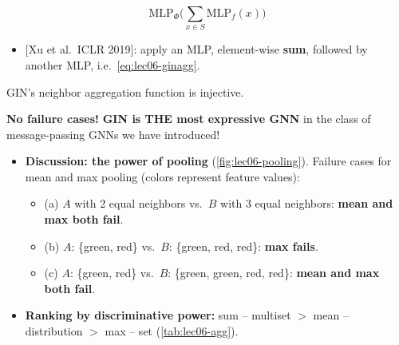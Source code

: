 \begin{equation}\label{eq:lec06-ginagg}
  \mathrm{MLP}_{\Phi}\Big(\sum_{x\in S}\mathrm{MLP}_f(x)\Big)
\end{equation}
\begin{itemize}
  \item {} [Xu et al.\ ICLR 2019]: apply an
    MLP, element-wise \textbf{sum}, followed by another MLP, i.e.\
    \cref{eq:lec06-ginagg}.
\end{itemize}
\begin{proposition}[Xu et al.\ ICLR 2019]\label{prop:lec06-gin}
  GIN's neighbor aggregation function is injective.
\end{proposition}
\begin{keyidea}
  \textbf{No failure cases!} \textbf{GIN is THE most expressive GNN} in the class
  of message-passing GNNs we have introduced!
\end{keyidea}
\begin{itemize}
  \item \textbf{Discussion: the power of pooling} (\cref{fig:lec06-pooling}).
    Failure cases for mean and max pooling (colors represent feature values):
    \begin{itemize}
      \item (a) $A$ with 2 equal neighbors vs.\ $B$ with 3 equal neighbors:
        \textbf{mean and max both fail}.
      \item (b) $A$: \{green, red\} vs.\ $B$: \{green, red, red\}: \textbf{max
        fails}.
      \item (c) $A$: \{green, red\} vs.\ $B$: \{green, green, red, red\}:
        \textbf{mean and max both fail}.
    \end{itemize}
  \item \textbf{Ranking by discriminative power:} sum -- multiset $>$ mean --
    distribution $>$ max -- set (\cref{tab:lec06-agg}).
\end{itemize}


